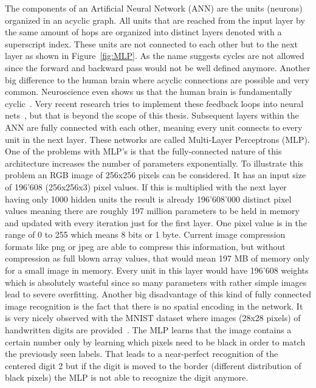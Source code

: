 The components of an Artificial Neural Network (ANN) are the units (neurons) organized in an acyclic graph. All units that are reached from the input layer by the same amount of hops are organized into distinct layers denoted with a superscript index. These units are not connected to each other but to the next layer as shown in Figure~\ref{fig:MLP}. As the name suggests cycles are not allowed since the forward and backward pass would not be well defined anymore. Another big difference to the human brain where acyclic connections are possible and very common. Neuroscience even shows us that the human brain is fundamentally cyclic~\cite{goodale1992separate}. Very recent research tries to implement these feedback loops into neural nets~\cite{caswell2016loopy}, but that is beyond the scope of this thesis. Subsequent layers within the ANN are fully connected with each other, meaning every unit connects to every unit in the next layer. These networks are called Multi-Layer Perceptrons (MLP). One of the problems with MLP's is that the fully-connected nature of this architecture increases the number of parameters exponentially. To illustrate this problem an RGB image of 256x256 pixels can be considered. It has an input size of 196'608 (256x256x3) pixel values. If this is multiplied with the next layer having only 1000 hidden units the result is already 196'608'000 distinct pixel values meaning there are roughly 197 million parameters to be held in memory and updated with every iteration just for the first layer. One pixel value is in the range of 0 to 255 which means 8 bits or 1 byte. Current image compression formats like png or jpeg are able to compress this information, but without compression as full blown array values, that would mean 197 MB of memory only for a small image in memory. Every unit in this layer would have 196'608 weights which is absolutely wasteful since so many parameters with rather simple images lead to severe overfitting. Another big disadvantage of this kind of fully connected image recognition is the fact that there is no spatial encoding in the network. It is very nicely observed with the MNIST dataset where images (28x28 pixels) of handwritten digits are provided~\cite{MNISTdatabase}. The MLP learns that the image contains a certain number only by learning which pixels need to be black in order to match the previously seen labels. That leads to a near-perfect recognition of the centered digit 2 but if the digit is moved to the border (different distribution of black pixels) the MLP is not able to recognize the digit anymore.\\


